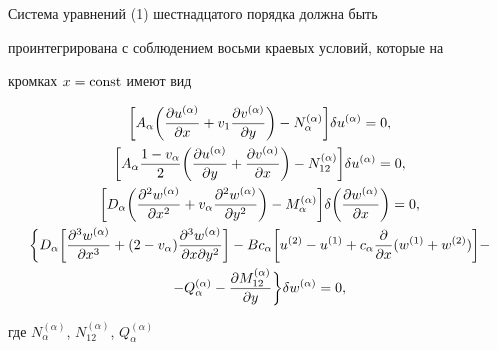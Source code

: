 Система уравнений (1) шестнадцатого порядка должна быть 


проинтегрирована с соблюдением восьми краевых условий, которые на 


кромках $x=\operatorname{const}$ имеют вид 


\begin{gather} 


\bigg[A_\alpha\bigg(\frac{\partial u^{(\alpha)}} 


{\partial x}+v_1\frac{\partial v^{(\alpha)}}{\partial y} \bigg) 


-N^{(\alpha)}_\alpha\bigg]\delta u^{(\alpha)}=0,\notag \\ 


% 


\bigg[A_\alpha\frac{1-v_\alpha}{2} 


\bigg(\frac{\partial u^{(\alpha)}} 


{\partial y}+\frac{\partial v^{(\alpha)}}{\partial x} \bigg) 


-N^{(\alpha)}_{12}\bigg]\delta u^{(\alpha)}=0,\notag\\ 


% 


\bigg[D_\alpha\bigg(\frac{\partial^2 w^{(\alpha)}} 


{\partial x^2}+v_\alpha 


\frac{\partial^2 w^{(\alpha)}}{\partial y^2} \bigg) 


-M^{(\alpha)}_\alpha\bigg]\delta\bigg( 


\frac{\partial w^{(\alpha)}}{\partial x}\bigg)=0,\\


%


\bigg\{D_\alpha\bigg[\frac{\partial^3w^{(\alpha)}}{\partial x^3} 


+(2-v_\alpha)\frac{\partial^3w^{(\alpha)}} 


{\partial x\partial y^2}\bigg]-Bc_\alpha\bigg[u^{(2)}-u^{(1)} 


+c_\alpha\frac{\partial}{\partial x}(w^{(1)}+w^{(2)})\bigg]-\notag\\ 


% 


-Q^{(\alpha)}_\alpha-\frac{\partial M^{(\alpha)}_{12}} 


{\partial y}\bigg\}\delta w^{(\alpha)}=0,\notag 


\end{gather} 


где $N^{(\alpha)}_\alpha$, $N^{(\alpha)}_{12}$, $Q^{(\alpha)}_\alpha$ 


